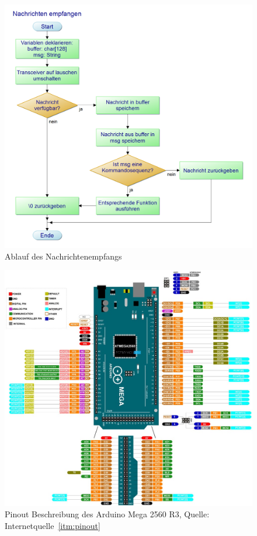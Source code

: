 \documentclass[a4paper, 11pt]{scrartcl}
\begin{document}
\begin{small}
\begin{figure}[H]
    \begin{center}
        \includegraphics[scale=0.35]{Bilder/Nachrichten_empfangen.png}
        \caption{Ablauf des Nachrichtenempfangs}\label{diag:receive_pap}
    \end{center}
\end{figure}

\begin{figure}[H]
    \begin{center}
        \includegraphics[scale=2.5]{Bilder/Arduino-Mega-Pinout.jpg}
        \caption{Pinout Beschreibung des Arduino Mega 2560 R3, Quelle: Internetquelle~\ref{itm:pinout}}\label{diag:pinout}
    \end{center}
\end{figure}


\end{small}
\end{document}
